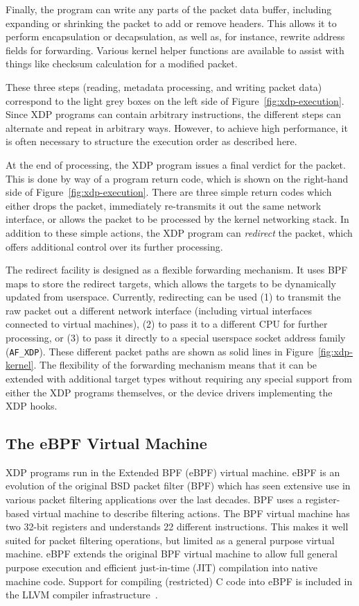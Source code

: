 \documentclass[sigconf]{acmart}
\begin{document}
Finally, the program can write any parts of the packet data buffer, including
expanding or shrinking the packet to add or remove headers. This allows it to
perform encapsulation or decapsulation, as well as, for instance, rewrite
address fields for forwarding. Various kernel helper functions are available to
assist with things like checksum calculation for a modified packet.

These three steps (reading, metadata processing, and writing packet data)
correspond to the light grey boxes on the left side of
Figure~\ref{fig:xdp-execution}. Since XDP programs can contain arbitrary
instructions, the different steps can alternate and repeat in arbitrary ways.
However, to achieve high performance, it is often necessary to structure the
execution order as described here.

At the end of processing, the XDP program issues a final verdict for the packet.
This is done by way of a program return code, which is shown on the right-hand
side of Figure~\ref{fig:xdp-execution}. There are three simple return codes
which either drops the packet, immediately re-transmits it out the same network
interface, or allows the packet to be processed by the kernel networking stack.
In addition to these simple actions, the XDP program can \emph{redirect} the
packet, which offers additional control over its further processing.

The redirect facility is designed as a flexible forwarding mechanism. It uses
BPF maps to store the redirect targets, which allows the targets to be
dynamically updated from userspace. Currently, redirecting can be used (1) to
transmit the raw packet out a different network interface (including virtual
interfaces connected to virtual machines), (2) to pass it to a different CPU for
further processing, or (3) to pass it directly to a special userspace socket
address family (\texttt{AF\_XDP}). These different packet paths are shown as
solid lines in Figure~\ref{fig:xdp-kernel}. The flexibility of the forwarding
mechanism means that it can be extended with additional target types without
requiring any special support from either the XDP programs themselves, or the
device drivers implementing the XDP hooks.

\subsection{The eBPF Virtual Machine}
\label{sec:bpf-vm}
XDP programs run in the Extended BPF (eBPF) virtual machine. eBPF is an
evolution of the original BSD packet filter (BPF) \cite{mccanne_bsd_1993} which
has seen extensive use in various packet filtering applications over the last
decades. BPF uses a register-based virtual machine to describe filtering
actions. The BPF virtual machine has two 32-bit registers and understands 22
different instructions. This makes it well suited for packet filtering
operations, but limited as a general purpose virtual machine. eBPF extends the
original BPF virtual machine to allow full general purpose execution and
efficient just-in-time (JIT) compilation into native machine code. Support for
compiling (restricted) C code into eBPF is included in the LLVM compiler
infrastructure~\cite{llvm}.
\end{document}
